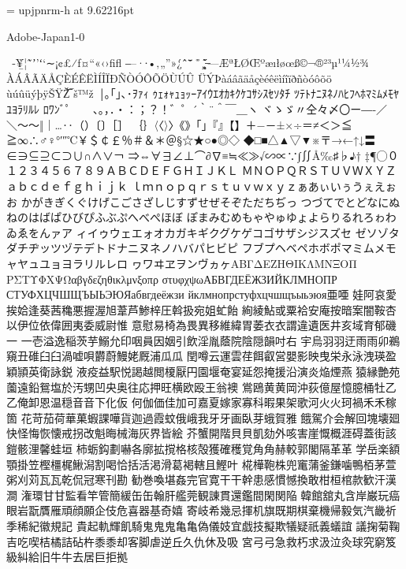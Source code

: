 %
%
%
%
\font\upjpnrm = upjpnrm-h at 9.62216pt
\upjpnrm


Adobe-Japan1-0

 ‑¥̲̀¦˜̃ʼ’ʻ‘∼¡¢£⁄ƒ¤“«‹›ﬁﬂ
‒–·∙•‚„”»¿́ˆ̂¯̄̆̇̈˚̊¸̧̨̋̌
̶—ÆªŁØŒºæıłøœß­©¬®²³µ¹¼½¾
ÀÁÂÃÄÅÇÈÉÊËÌÍÎÏÐÑÒÓÔÕÖÙÚÛ
ÜÝÞàáâãäåçèéêëìíîïðñòóôõö
ùúûüýþÿŠŸŽ̅‾š™ž ￨｡｢｣､･ｦｧｨ
ｩｪｫｬｭｮｯｰｱｲｳｴｵｶｷｸｹｺｻｼｽｾｿﾀﾁ
ﾂﾃﾄﾅﾆﾇﾈﾉﾊﾋﾌﾍﾎﾏﾐﾑﾒﾓﾔﾕﾖﾗﾘﾙﾚ
ﾛﾜﾝﾞﾟ 　、。，．・：；？！゛゜´｀¨＾￣＿ヽ
ヾゝゞ〃仝々〆〇ー―‐／＼〜～‖｜…‥（）〔〕［］
｛｝〈〈〉〉《》「」『』【】＋−－±×÷＝≠＜＞≦
≧∞∴♂♀°′″℃￥＄￠￡％＃＆＊＠§☆★○●◎◇
◆□■△▲▽▼※〒→←↑↓〓∈∋⊆⊇⊂⊃∪∩∧∨￢
⇒⇔∀∃∠⊥⌒∂∇≡≒≪≫√∽∝∵∫∬Å‰♯♭♪†
‡¶◯０１２３４５６７８９ＡＢＣＤＥＦＧＨＩＪＫＬ
ＭＮＯＰＱＲＳＴＵＶＷＸＹＺａｂｃｄｅｆｇｈｉｊｋ
ｌｍｎｏｐｑｒｓｔｕｖｗｘｙｚぁあぃいぅうぇえぉお
かがきぎくぐけげこごさざしじすずせぜそぞただちぢっ
つづてでとどなにぬねのはばぱひびぴふぶぷへべぺほぼ
ぽまみむめもゃやゅゆょよらりるれろゎわゐゑをんァア
ィイゥウェエォオカガキギクグケゲコゴサザシジスズセ
ゼソゾタダチヂッツヅテデトドナニヌネノハバパヒビピ
フブプヘベペホボポマミムメモャヤュユョヨラリルレロ
ヮワヰヱヲンヴヵヶΑΒΓΔΕΖΗΘΙΚΛΜΝΞΟΠ
ΡΣΤΥΦΧΨΩαβγδεζηθικλμνξοπρ
στυφχψωАБВГДЕЁЖЗИЙКЛМНОПР
СТУФХЦЧШЩЪЫЬЭЮЯабвгдеёжзи
йклмнопрстуфхцчшщъыьэюя亜唖
娃阿哀愛挨姶逢葵茜穐悪握渥旭葦芦鯵梓圧斡扱宛姐虻飴
絢綾鮎或粟袷安庵按暗案闇鞍杏以伊位依偉囲夷委威尉惟
意慰易椅為畏異移維緯胃萎⾐衣謂違遺医井亥域育郁磯⼀
一壱溢逸稲茨芋鰯允印咽員因姻引飲淫胤蔭院陰隠韻吋右
宇烏⽻羽迂⾬雨卯鵜窺丑碓⾅臼渦嘘唄欝蔚鰻姥厩浦⽠瓜
閏噂云運雲荏餌叡営嬰影映曳栄永泳洩瑛盈穎頴英衛詠鋭
液疫益駅悦謁越閲榎厭円園堰奄宴延怨掩援沿演炎焔煙燕
猿縁艶苑薗遠鉛鴛塩於汚甥凹央奥往応押旺横欧殴王翁襖
鴬鴎⻩黄岡沖荻億屋憶臆桶牡⼄乙俺卸恩温穏⾳音下化仮
何伽価佳加可嘉夏嫁家寡科暇果架歌河⽕火珂禍⽲禾稼箇
花苛茄荷華菓蝦課嘩貨迦過霞蚊俄峨我⽛牙画臥芽蛾賀雅
餓駕介会解回塊壊廻快怪悔恢懐戒拐改魁晦械海灰界皆絵
芥蟹開階⾙貝凱劾外咳害崖慨概涯碍蓋街該鎧骸浬馨蛙垣
柿蛎鈎劃嚇各廓拡撹格核殻獲確穫覚⾓角赫較郭閣隔⾰革
学岳楽額顎掛笠樫橿梶鰍潟割喝恰括活渇滑葛褐轄且鰹叶
椛樺鞄株兜竃蒲釜鎌噛鴨栢茅萱粥刈苅⽡瓦乾侃冠寒刊勘
勧巻喚堪姦完官寛⼲干幹患感慣憾換敢柑桓棺款歓汗漢澗
潅環⽢甘監看竿管簡緩⽸缶翰肝艦莞観諌貫還鑑間閑関陥
韓館舘丸含岸巌玩癌眼岩翫贋雁頑顔願企伎危喜器基奇嬉
寄岐希幾忌揮机旗既期棋棄機帰毅気汽畿祈季稀紀徽規記
貴起軌輝飢騎⻤⿁鬼⻲亀偽儀妓宜戯技擬欺犠疑祇義蟻誼
議掬菊鞠吉吃喫桔橘詰砧杵⿉黍却客脚虐逆丘久仇休及吸
宮⼸弓急救朽求汲泣灸球究窮笈級糾給旧⽜牛去居巨拒拠
